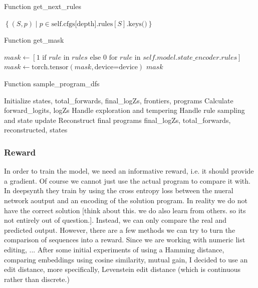 \begin{algorithm}
\caption{Function get\_next\_rules}
\begin{algorithmic}[1]
    \State \Return $\left\{ (S, p) \mid p \in \text{self.cfgs[depth].rules}[S].\text{keys()} \right\}$
\EndFunction
\end{algorithmic}
\end{algorithm}

\begin{algorithm}
\caption{Function get\_mask}
\begin{algorithmic}[1]
    \State $mask \gets [1 \text{ if } rule \text{ in } rules \text{ else } 0 \text{ for } rule \text{ in } self.model.state\_encoder.rules]$
    \State $mask \gets \text{torch.tensor}(mask, \text{device=device})$
    \State \Return $mask$
\EndFunction
\end{algorithmic}
\end{algorithm}

\begin{algorithm}
\caption{Function sample\_program\_dfs}
\begin{algorithmic}[1]
    \State Initialize states, total\_forwards, final\_logZs, frontiers, programs
        \State Calculate forward\_logits, logZs
        \State Handle exploration and tempering
                \State Handle rule sampling and state update
            \EndIf
        \EndFor
    \EndWhile
        \State Reconstruct final programs
        \State \Return final\_logZs, total\_forwards, reconstructed, states
    \EndIf
\EndFunction
\end{algorithmic}
\end{algorithm}




\subsubsection{Reward}

In order to train the model, we need an informative reward, i.e. it should provide a gradient.
Of course we cannot just use the actual program to compare it with. In deepsynth they train by using the cross entropy loss between the nueral network aoutput and an encoding of the solution program. In reality we do not have the correct solution [think about this. we do also learn from others. so its not entirely out of question.]. Instead, we can only compare the real and predicted output. However, there are a few methods we can try to turn the comparison of sequences into a reward. Since we are working with numeric list editing, ...
After some initial experiments of using a Hamming distance, comparing embeddings using cosine similarity, mutual gain, I decided to use an edit distance, more specifically, Levenstein edit distance (which is continuous rather than discrete.) 


